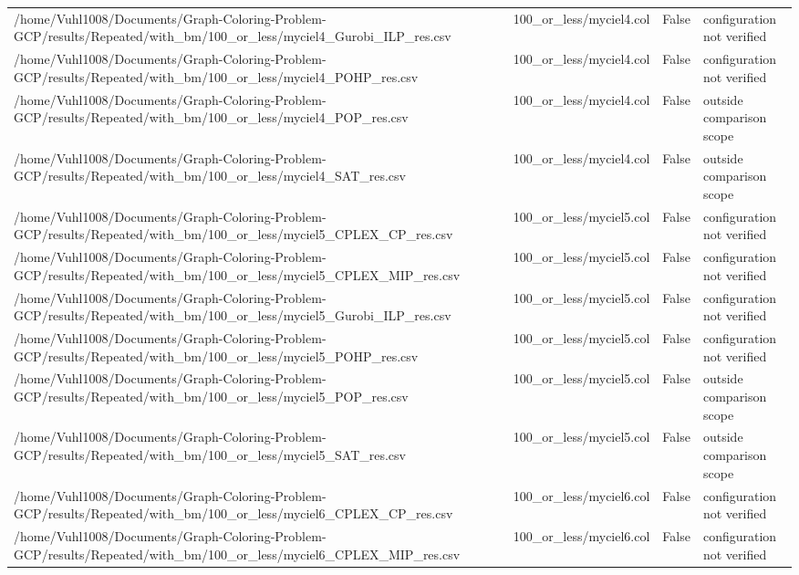 \begin{table}[htbp]
\begin{tabular}{llll}
/home/Vuhl1008/Documents/Graph-Coloring-Problem-GCP/results/Repeated/with\_bm/100\_or\_less/myciel4\_Gurobi\_ILP\_res.csv & 100\_or\_less/myciel4.col & False & configuration not verified \\
/home/Vuhl1008/Documents/Graph-Coloring-Problem-GCP/results/Repeated/with\_bm/100\_or\_less/myciel4\_POHP\_res.csv & 100\_or\_less/myciel4.col & False & configuration not verified \\
/home/Vuhl1008/Documents/Graph-Coloring-Problem-GCP/results/Repeated/with\_bm/100\_or\_less/myciel4\_POP\_res.csv & 100\_or\_less/myciel4.col & False & outside comparison scope \\
/home/Vuhl1008/Documents/Graph-Coloring-Problem-GCP/results/Repeated/with\_bm/100\_or\_less/myciel4\_SAT\_res.csv & 100\_or\_less/myciel4.col & False & outside comparison scope \\
/home/Vuhl1008/Documents/Graph-Coloring-Problem-GCP/results/Repeated/with\_bm/100\_or\_less/myciel5\_CPLEX\_CP\_res.csv & 100\_or\_less/myciel5.col & False & configuration not verified \\
/home/Vuhl1008/Documents/Graph-Coloring-Problem-GCP/results/Repeated/with\_bm/100\_or\_less/myciel5\_CPLEX\_MIP\_res.csv & 100\_or\_less/myciel5.col & False & configuration not verified \\
/home/Vuhl1008/Documents/Graph-Coloring-Problem-GCP/results/Repeated/with\_bm/100\_or\_less/myciel5\_Gurobi\_ILP\_res.csv & 100\_or\_less/myciel5.col & False & configuration not verified \\
/home/Vuhl1008/Documents/Graph-Coloring-Problem-GCP/results/Repeated/with\_bm/100\_or\_less/myciel5\_POHP\_res.csv & 100\_or\_less/myciel5.col & False & configuration not verified \\
/home/Vuhl1008/Documents/Graph-Coloring-Problem-GCP/results/Repeated/with\_bm/100\_or\_less/myciel5\_POP\_res.csv & 100\_or\_less/myciel5.col & False & outside comparison scope \\
/home/Vuhl1008/Documents/Graph-Coloring-Problem-GCP/results/Repeated/with\_bm/100\_or\_less/myciel5\_SAT\_res.csv & 100\_or\_less/myciel5.col & False & outside comparison scope \\
/home/Vuhl1008/Documents/Graph-Coloring-Problem-GCP/results/Repeated/with\_bm/100\_or\_less/myciel6\_CPLEX\_CP\_res.csv & 100\_or\_less/myciel6.col & False & configuration not verified \\
/home/Vuhl1008/Documents/Graph-Coloring-Problem-GCP/results/Repeated/with\_bm/100\_or\_less/myciel6\_CPLEX\_MIP\_res.csv & 100\_or\_less/myciel6.col & False & configuration not verified \\

\end{tabular}
\end{table}
